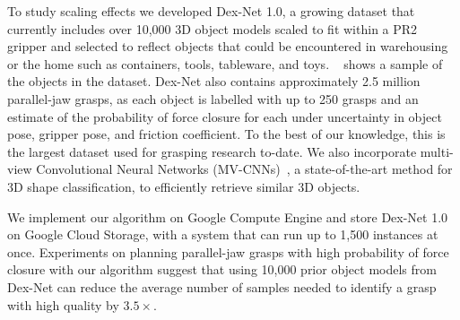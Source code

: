 To study scaling effects we developed Dex-Net 1.0, a growing dataset that currently includes over 10,000 3D object models scaled to fit within a PR2 gripper and selected to reflect objects that could be encountered in warehousing or the home such as containers, tools, tableware, and toys.
~ shows a sample of the objects in the dataset.
Dex-Net also contains approximately 2.5 million parallel-jaw grasps, as each object is labelled with up to 250 grasps and an estimate of the probability of force closure for each under uncertainty in object pose, gripper pose, and friction coefficient.
To the best of our knowledge, this is the largest dataset used for grasping research to-date.
We also incorporate multi-view Convolutional Neural Networks (MV-CNNs)~\cite{su2015multi}, a state-of-the-art method for 3D shape classification, to efficiently retrieve similar 3D objects. 

We implement our algorithm on Google Compute Engine and store Dex-Net 1.0 on Google Cloud Storage, with a system that can run up to 1,500 instances at once.
Experiments on planning parallel-jaw grasps with high probability of force closure with our algorithm suggest that using 10,000 prior object models from Dex-Net can reduce the average number of samples needed to identify a grasp with high quality by $3.5\times$.

 





